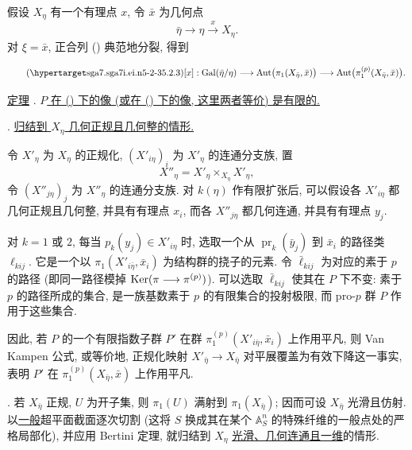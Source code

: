 假设 $X_\eta$ 有一个有理点 $x$, 令 $\bar x$ 为几何点
\[
\bar\eta\longrightarrow\eta\xrightarrow{\ x\ }X_\eta.
\]
对 $\xi=\bar x$, 正合列 () 典范地分裂, 得到


\begin{equation}\tag{\SGARefTarget{sga7.sga7i.ei.n5-2-3}{5.2.3}}
[x]:\Gal(\bar\eta/\eta)
\longrightarrow\Aut\bigl(\pi_1(X_{\bar\eta},\bar x)\bigr)
\longrightarrow\Aut\bigl(\pi_1^{(p)}(X_{\bar\eta},\bar x)\bigr).
\end{equation}

\underline{定理} . \underline{$P$ 在 () 下的像 (或在 () 下的像, 这里两者等价) 是有限的.}

. \underline{归结到 $X_\eta$ 几何正规且几何整的情形.}

令 $X'_\eta$ 为 $X_\eta$ 的正规化, $(X'_{i\eta})_i$ 为 $X'_\eta$ 的连通分支族, 置
\[
X''_\eta=X'_\eta\times_{X_\eta}X'_\eta,
\]
令 $(X''_{j\eta})_j$ 为 $X''_\eta$ 的连通分支族. 对 $k(\eta)$ 作有限扩张后, 可以假设各 $X'_{i\eta}$ 都几何正规且几何整, 并具有有理点 $x_i$, 而各 $X''_{j\eta}$ 都几何连通, 并具有有理点 $y_j$.

对 $k=1$ 或 $2$, 每当 $p_k(y_j)\in X'_{i\eta}$ 时, 选取一个从 $\operatorname{pr}_k(\bar y_j)$ 到 $\bar x_i$ 的路径类 $\ell_{kij}$. 它是一个以 $\pi_1(X'_{i\bar\eta},\bar x_i)$ 为结构群的挠子的元素. 令 $\bar\ell_{kij}$ 为对应的素于 $p$ 的路径 (即同一路径模掉 $\operatorname{Ker}(\pi\longrightarrow\pi^{(p)})$). 可以选取 $\bar\ell_{kij}$ 使其在 $P$ 下不变: 素于 $p$ 的路径所成的集合, 是一族基数素于 $p$ 的有限集合的投射极限, 而 pro-$p$ 群 $P$ 作用于这些集合.

因此, 若 $P$ 的一个有限指数子群 $P'$ 在群 $\pi_1^{(p)}(X'_{i\bar\eta},\bar x_i)$ 上作用平凡, 则 Van Kampen 公式, 或等价地, 正规化映射 $X'_{\bar\eta}\longrightarrow X_{\bar\eta}$ 对平展覆盖为有效下降这一事实, 表明 $P'$ 在 $\pi_1^{(p)}(X_{\bar\eta},\bar x)$ 上作用平凡.

. 若 $X_{\bar\eta}$ 正规, $U$ 为开子集, 则 $\pi_1(U)$ 满射到 $\pi_1(X_{\bar\eta})$; 因而可设 $X_{\bar\eta}$ 光滑且仿射. 以\underline{一般}超平面截面逐次切割 (这将 $S$ 换成其在某个 $\mathbb A^n_S$ 的特殊纤维的一般点处的严格局部化), 并应用 Bertini 定理, 就归结到 $X_\eta$ \underline{光滑、几何连通且一维}的情形.

